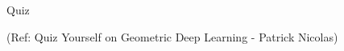 \begin{frame}[fragile]\frametitle{}
\begin{center}
{\Large Quiz}

{\tiny (Ref: Quiz Yourself on Geometric Deep Learning - Patrick Nicolas)}
\end{center}
\end{frame}

